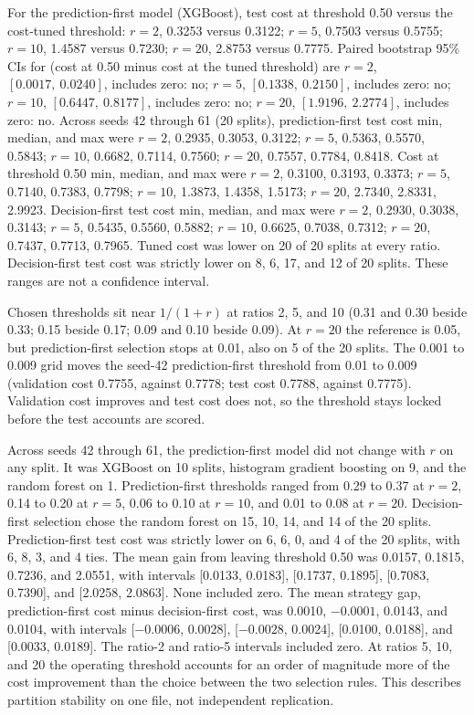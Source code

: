 \documentclass[12pt]{article}
\begin{document}
\begin{table}[htbp]
\begin{singlespace}
\parbox{\linewidth}{\footnotesize For the prediction-first model (XGBoost), test cost at threshold 0.50 versus the cost-tuned threshold: $r=2$, 0.3253 versus 0.3122; $r=5$, 0.7503 versus 0.5755; $r=10$, 1.4587 versus 0.7230; $r=20$, 2.8753 versus 0.7775. Paired bootstrap 95\% CIs for (cost at 0.50 minus cost at the tuned threshold) are $r=2$, $[0.0017,\ 0.0240]$, includes zero: no; $r=5$, $[0.1338,\ 0.2150]$, includes zero: no; $r=10$, $[0.6447,\ 0.8177]$, includes zero: no; $r=20$, $[1.9196,\ 2.2774]$, includes zero: no. Across seeds 42 through 61 (20 splits), prediction-first test cost min, median, and max were $r=2$, 0.2935, 0.3053, 0.3122; $r=5$, 0.5363, 0.5570, 0.5843; $r=10$, 0.6682, 0.7114, 0.7560; $r=20$, 0.7557, 0.7784, 0.8418. Cost at threshold 0.50 min, median, and max were $r=2$, 0.3100, 0.3193, 0.3373; $r=5$, 0.7140, 0.7383, 0.7798; $r=10$, 1.3873, 1.4358, 1.5173; $r=20$, 2.7340, 2.8331, 2.9923. Decision-first test cost min, median, and max were $r=2$, 0.2930, 0.3038, 0.3143; $r=5$, 0.5435, 0.5560, 0.5882; $r=10$, 0.6625, 0.7038, 0.7312; $r=20$, 0.7437, 0.7713, 0.7965. Tuned cost was lower on 20 of 20 splits at every ratio. Decision-first test cost was strictly lower on 8, 6, 17, and 12 of 20 splits. These ranges are not a confidence interval.}
\end{singlespace}
\end{table}

Chosen thresholds sit near \(1/(1+r)\) at ratios 2, 5, and 10 (0.31 and 0.30 beside 0.33; 0.15 beside 0.17; 0.09 and 0.10 beside 0.09). At \(r=20\) the reference is 0.05, but prediction-first selection stops at 0.01, also on 5 of the 20 splits. The 0.001 to 0.009 grid moves the seed-42 prediction-first threshold from 0.01 to 0.009 (validation cost 0.7755, against 0.7778; test cost 0.7788, against 0.7775). Validation cost improves and test cost does not, so the threshold stays locked before the test accounts are scored.

Across seeds 42 through 61, the prediction-first model did not change with \(r\) on any split. It was XGBoost on 10 splits, histogram gradient boosting on 9, and the random forest on 1. Prediction-first thresholds ranged from 0.29 to 0.37 at \(r=2\), 0.14 to 0.20 at \(r=5\), 0.06 to 0.10 at \(r=10\), and 0.01 to 0.08 at \(r=20\). Decision-first selection chose the random forest on 15, 10, 14, and 14 of the 20 splits. Prediction-first test cost was strictly lower on 6, 6, 0, and 4 of the 20 splits, with 6, 8, 3, and 4 ties. The mean gain from leaving threshold 0.50 was 0.0157, 0.1815, 0.7236, and 2.0551, with intervals [0.0133, 0.0183], [0.1737, 0.1895], [0.7083, 0.7390], and [2.0258, 2.0863]. None included zero. The mean strategy gap, prediction-first cost minus decision-first cost, was 0.0010, \(-0.0001\), 0.0143, and 0.0104, with intervals [\(-0.0006\), 0.0028], [\(-0.0028\), 0.0024], [0.0100, 0.0188], and [0.0033, 0.0189]. The ratio-2 and ratio-5 intervals included zero. At ratios 5, 10, and 20 the operating threshold accounts for an order of magnitude more of the cost improvement than the choice between the two selection rules. This describes partition stability on one file, not independent replication.
\end{document}
